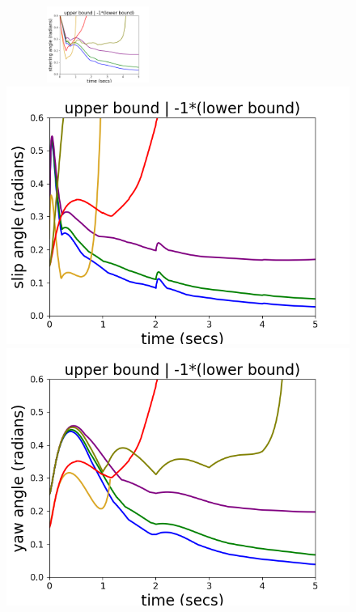 \begin{figure}
\includegraphics[width=6cm,height=2.5cm]{autocarImages/ubToolSteering.png}%
\includegraphics[scale = 0.39]{autocarImages/ubToolSlip.png}
\includegraphics[scale = 0.39]{autocarImages/ubToolYaw.png}%

\end{figure}

